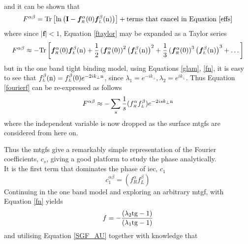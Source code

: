 \documentclass[a4paper, 12pt]{article}
\begin{document}
and it can be shown that\textsuperscript{\textcolor{blue}{\cite{com}}}
\begin{equation}\label{ftaylor}
	F^{\alpha\beta} = {\rm Tr}\left[\ln\left({\bf I}-\bm f_{\scriptscriptstyle R}^{\alpha}(0)\bm f_{\scriptscriptstyle L}^{\beta}({\rm n})\right)\right] + \text{terms that cancel in Equation \eqref{effs}}
\end{equation}
where since $|\bm f| <1$, Equation \eqref{ftaylor} may be expanded as a Taylor series
\begin{equation}\label{fourierf}
	F^{\alpha\beta} \approx -{\rm Tr}\left[\bm f_{\scriptscriptstyle R}^{\alpha}(0) \bm f_{\scriptscriptstyle L}^{\beta}({\rm n})+\frac{1}{2}\left(\bm f_{\scriptscriptstyle R}^{\alpha}(0)\right)^2 \left(\bm f_{\scriptscriptstyle L}^{\beta}({\rm n})\right)^2+\frac{1}{3}\left(\bm f_{\scriptscriptstyle R}^{\alpha}(0)\right)^3 \left(\bm f_{\scriptscriptstyle L}^{\beta}({\rm n})\right)^3+\dots\right]
\end{equation}
but in the one band tight binding model, using Equations \eqref{glam}, \eqref{fn}, it is easy to see that $f_{\scriptscriptstyle L}^{\beta}({\rm n}) = f_{\scriptscriptstyle L}^{\beta}({\rm 0})e^{-2ik_\perp \rm n}$, since $\lambda_1 = e^{-ik_\perp}, \lambda_2 = e^{ik_\perp}$. Thus Equation \eqref{fourierf} can be re-expressed as follows
\begin{equation}\label{fs}
	F^{\alpha\beta} \approx -\sum_s \frac{1}{s}(f_{\scriptscriptstyle R}^\alpha f_{\scriptscriptstyle L}^\beta)e^{-2isk_\perp {\rm n}}
\end{equation}
where the independent variable is now dropped as the surface \gls{mtgf}s are considered from here on.
\\\par Thus the \gls{mtgf}s give a remarkably simple representation of the Fourier coefficients, $c_s$, giving a good platform to study the phase analytically.
\\[2mm] It is the first term that dominates the phase of \gls{iec}, $c_1$
\begin{equation}
	c_1^{\alpha\beta} = (f_{\scriptscriptstyle R}^\alpha f_{\scriptscriptstyle L}^\beta)
\end{equation}
Continuing in the one band model and exploring an arbitrary \gls{mtgf}, with Equation \eqref{fn} yields
\begin{equation}
	f = -\frac{(\lambda_2{\rm t g} - 1)}{(\lambda_1 {\rm t g} - 1)}
\end{equation}
and utilising Equation \eqref{SGF_AU} together with knowledge that 
\end{document}
